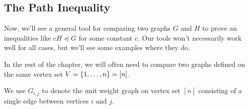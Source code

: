 


\subsection{The Path Inequality}
Now, we'll see a general tool
for comparing two graphs $G$ and $H$ to prove
an inequalities like $c H
\preceq G$ for some constant $c$.
Our tools won't necessarily work well for all cases, but we'll see
some examples where they do.


In the rest of the chapter, we will often need to compare two graphs
defined on the same vertex set $V = \left\{1,\ldots,n \right\} = [n]$.

We use $G_{i,j}$ to denote the unit weight graph on vertex set $[n]$
consisting of a single edge between vertices $i$ and $j$.

